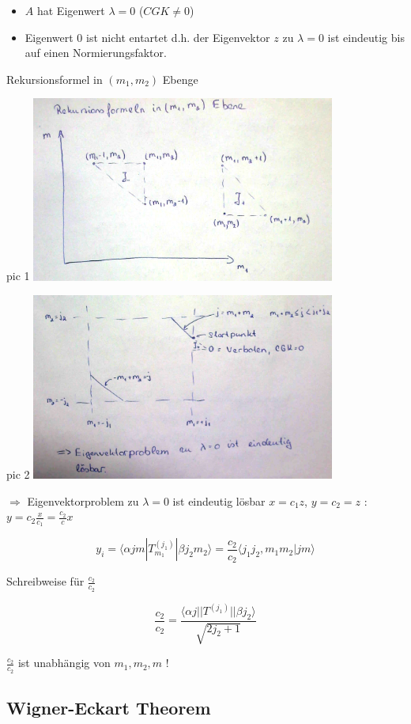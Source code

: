 \begin{itemize}
\item \(A\) hat Eigenwert \(\lambda=0\) (\(CGK\neq 0\))
\item Eigenwert 0 ist nicht entartet d.h. der Eigenvektor \(z\)  zu
  \(\lambda=0\) ist eindeutig bis auf einen Normierungsfaktor.
\end{itemize}

Rekursionsformel in \((m_1,m_2)\) Ebenge

pic 1
\includegraphics[width=0.75\textwidth]{09_01.png}

pic 2
\includegraphics[width=0.75\textwidth]{09_02.png}

\(\Rightarrow\) Eigenvektorproblem zu \(\lambda = 0\) ist eindeutig lösbar
\(x=c_1z\), \(y=c_2=z\) : \(y=c_2 \frac x {c_1} = \frac {c_2}{c} x\)

\[ y_i = \langle \alpha jm|T^{(j_1)}_{m_1}|\beta j_2 m_2\rangle =
\frac {c_2}{c_2}  \langle j_1j_2, m_1m_2| jm\rangle\]

Schreibweise für \(\frac {c_2}{c_2}\)

\[\frac {c_2}{c_2} = \frac {\langle \alpha j||T^{(j_1)}||\beta  j_2\rangle}{\sqrt{2j_2+1}}\]

\(\frac {c_2}{c_2}\) ist unabhängig von \(m_1,m_2,m\) !

\subsection{Wigner-Eckart Theorem}

